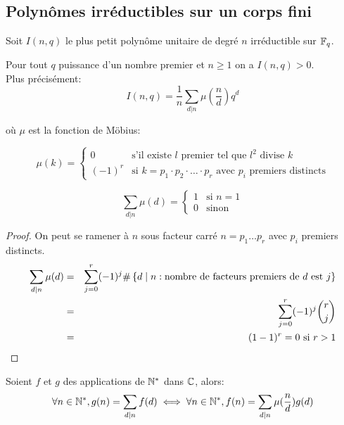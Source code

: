 \subsection{Polynômes irréductibles sur un corps fini}


Soit $I(n,q)$ le plus petit polynôme unitaire de degré $n$ irréductible sur $\mathbb{F}_q$.

\begin{theorem}
	Pour tout $q$ puissance d'un nombre premier et $n \geq 1$ on a $I(n,q) > 0$.\\

	Plus précisément:
	$$ I(n,q) = \frac{1}{n} \sum_{d|n} \mu(\frac{n}{d}) q^d$$

	où $\mu$ est la fonction de Möbius:

	\[ \mu(k) = \left\{\begin{array}{ll}
			0      & \text{s'il existe } l \text{ premier tel que } l^2 \text{ divise } k                            \\
			(-1)^r & \text{si } k = p_1 \cdot p_2 \cdot \ldots \cdot p_r \text{ avec } p_i \text{ premiers distincts}
		\end{array} \right.\]

\end{theorem}

\begin{lemma}
	$$\sum_{d|n} \mu(d) = \left\{\begin{array}{ll}
			1 & \text{si } n = 1 \\
			0 & \text{sinon}
		\end{array} \right.$$
\end{lemma}

\begin{proof}
	On peut se ramener à $n$ sous facteur carré $n = p_1 \ldots p_r$ avec $p_i$ premiers distincts.\\
	\begin{eqnarray*}
		\sum_{d|n} \mu(d) &=& \sum_{j=0}^r (-1)^j \#\left\{d \mid n : \text{nombre de facteurs premiers de } d \text { est } j\right\} \\
		&=& \sum_{j=0}^r (-1)^j \binom{r}{j} \\
		&=& (1-1)^r = 0 \text{ si } r > 1
	\end{eqnarray*}
\end{proof}

\begin{lemma}
	Soient $f$ et $g$ des applications de $\mathbb{N}^*$ dans $\mathbb{C}$, alors:
	$$ \forall n \in \mathbb{N}^*, g(n) = \sum_{d|n} f(d) \iff \forall n \in \mathbb{N}^*, f(n) = \sum_{d|n} \mu(\frac n d) g(d) $$

\end{lemma}

